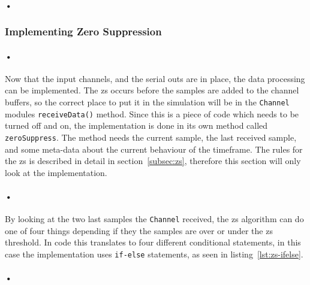 \documentclass[a4paper, 12pt]{report}
\newcommand{\codeword}[1]{\texttt{#1}}
\begin{document}
\paragraph{•}
\begin{minipage}{\linewidth}

\end{minipage}

\subsubsection{Implementing Zero Suppression}

\paragraph{•} 
Now that the input channels, and the serial outs are in place, the data processing can be implemented.
The \gls{zs} occurs before the samples are added to the channel buffers, so the correct place to put it in the simulation will be in the \codeword{Channel} modules \codeword{receiveData()} method.
Since this is a piece of code which needs to be turned off and on, the implementation is done in its own method called \codeword{zeroSuppress}.
The method needs the current sample, the last received sample, and some meta-data about the current behaviour of the timeframe.
The rules for the \gls{zs} is described in detail in section~\ref{subsec:zs}, therefore this section will only look at the implementation.

\paragraph{•}
By looking at the two last samples the \codeword{Channel} received, the \gls{zs} algorithm can do one of four things depending if they the samples are over or under the \gls{zs} threshold.
In code this translates to four different conditional statements, in this case the implementation uses \codeword{if-else} statements, as seen in listing~\ref{lst:zs-ifelse}.

\paragraph{•}
\begin{minipage}{\linewidth}

\end{minipage}
\end{document}
